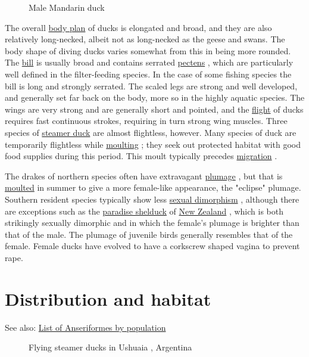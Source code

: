 \documentclass[11pt,a4paper]{article}
\begin{document}
\begin{figure}[h]
\caption{Male Mandarin duck}
\end{figure}

The overall \href{/wiki/Body\_plan}{body plan} of ducks is elongated and broad, and they are also relatively long-necked, albeit not as long-necked as the geese and swans. The body shape of diving ducks varies somewhat from this in being more rounded. The \href{/wiki/Beak}{bill} is usually broad and contains serrated \href{/wiki/Pecten\_\%28biology\%29}{pectens} , which are particularly well defined in the filter-feeding species. In the case of some fishing species the bill is long and strongly serrated. The scaled legs are strong and well developed, and generally set far back on the body, more so in the highly aquatic species. The wings are very strong and are generally short and pointed, and the \href{/wiki/Bird\_flight}{flight} of ducks requires fast continuous strokes, requiring in turn strong wing muscles. Three species of \href{/wiki/Steamer\_duck}{steamer duck} are almost flightless, however. Many species of duck are temporarily flightless while \href{/wiki/Moult}{moulting} ; they seek out protected habitat with good food supplies during this period. This moult typically precedes \href{/wiki/Bird\_migration}{migration} .

The drakes of northern species often have extravagant \href{/wiki/Plumage}{plumage} , but that is \href{/wiki/Moult}{moulted} in summer to give a more female-like appearance, the "eclipse" plumage. Southern resident species typically show less \href{/wiki/Sexual\_dimorphism}{sexual dimorphism} , although there are exceptions such as the \href{/wiki/Paradise\_shelduck}{paradise shelduck} of \href{/wiki/New\_Zealand}{New Zealand} , which is both strikingly sexually dimorphic and in which the female's plumage is brighter than that of the male. The plumage of juvenile birds generally resembles that of the female. Female ducks have evolved to have a corkscrew shaped vagina to prevent rape.

\section{Distribution and habitat}

See also: \href{/wiki/List\_of\_Anseriformes\_by\_population}{List of Anseriformes by population}

\begin{figure}[h]
\caption{Flying steamer ducks in Ushuaia , Argentina}
\end{figure}
\end{document}
